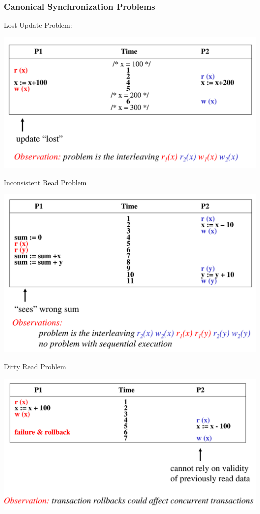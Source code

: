 \documentclass[11pt]{article}
\begin{document}
\subsubsection{Canonical Synchronization Problems}
\label{sec:org9b83e85}

Lost Update Problem:
\begin{center}
\includegraphics[width=.8\textwidth]{../images/bigdatabase/2.png}
\label{}
\end{center}

Inconsistent Read Problem
\begin{center}
\includegraphics[width=.8\textwidth]{../images/bigdatabase/3.png}
\label{}
\end{center}

Dirty Read Problem
\begin{center}
\includegraphics[width=.8\textwidth]{../images/bigdatabase/4.png}
\label{}
\end{center}
\end{document}
